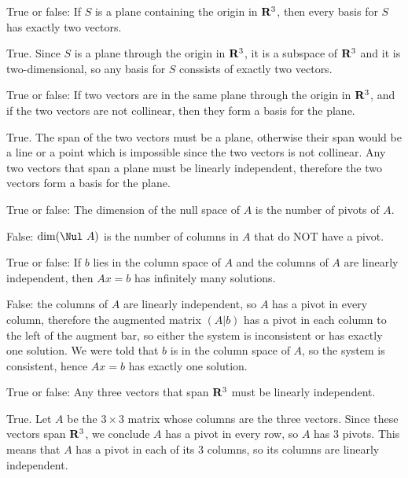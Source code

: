 \begin{problems}
  \problem %
  True or false: If $S$ is a plane containing the origin in ${\bf R}^3$, then
  every basis for $S$ has exactly two vectors.

\begin{solution}
  True. Since $S$ is a plane through the origin in ${\bf R}^3$, it is a subspace
  of ${\bf R}^3$ and it is two-dimensional, so any basis for $S$ conssists of
  exactly two vectors.
\end{solution}

\problem %
True or false: If two vectors are in the same plane through the origin in
${\bf R}^3$, and if the two vectors are not collinear, then they form a basis
for the plane.

\begin{solution}
True.  The span of the two vectors must be a plane, otherwise their span 
would be a line or a point which is impossible since the two vectors is 
not collinear.  Any two vectors that span a plane must be linearly 
independent, therefore the two vectors form a basis for the plane.
\end{solution}

\problem %
True or false: The dimension of the null space of $A$ is the number of 
pivots of $A$.

\begin{solution}
False: $\dim(\Nul \ A)$ is the number of columns in $A$ that do NOT have 
a pivot.
\end{solution}

\problem %
True or false: If $b$ lies in the column space of $A$ and the columns of $A$ are
linearly independent, then $Ax = b$ has infinitely many solutions.

\begin{solution}
  False: the columns of $A$ are linearly independent, so $A$ has a pivot in
  every column, therefore the augmented matrix $(A | b)$ has a pivot in each
  column to the left of the augment bar, so either the system is inconsistent or
  has exactly one solution.  We were told that $b$ is in the column space of
  $A$, so the system is consistent, hence $Ax = b$ has exactly one solution.
\end{solution}

\problem %
True or false: Any three vectors that span ${\bf R}^3$ must be linearly 
independent.

\begin{solution}
  True.  Let $A$ be the $3 \times 3$ matrix whose columns are the three vectors.
  Since these vectors span ${\bf R}^3$, we conclude $A$ has a pivot in every
  row, so $A$ has $3$ pivots.  This means that $A$ has a pivot in each of its
  $3$ columns, so its columns are linearly independent.
\end{solution}


\end{problems}
